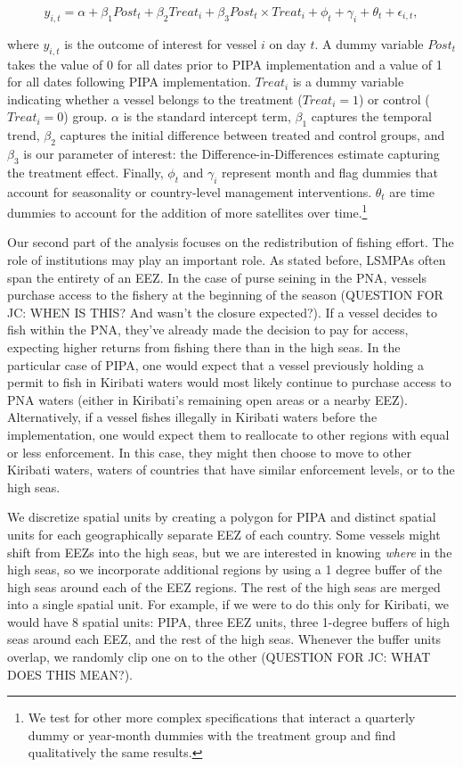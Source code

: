 \documentclass[11pt,english]{article}
\begin{document}
\[
y_{i,t} = \alpha + \beta_1 Post_t + \beta_2 Treat_i + \beta_3 Post_t \times Treat_i + \phi_t + \gamma_i + \theta_t + \epsilon_{i,t},
\]

where \(y_{i,t}\) is the outcome of interest for vessel \(i\) on day \(t\). A dummy variable \(Post_t\) takes the value of 0 for all
dates prior to PIPA implementation and a value of 1 for all dates
following PIPA implementation. \(Treat_i\) is a dummy
variable indicating whether a vessel belongs to the treatment (\(Treat_i = 1\)) or control
(\(Treat_i = 0\)) group. \(\alpha\) is
the standard intercept term, \(\beta_1\) captures the temporal trend,
\(\beta_2\) captures the initial difference between treated and control groups,
and \(\beta_3\) is our parameter of interest: the Difference-in-Differences estimate capturing
the treatment effect. Finally, \(\phi_t\) and \(\gamma_i\) represent
month and flag dummies that account for seasonality or
country-level management interventions. \(\theta_t\) are time dummies to
account for the addition of more satellites over time.\footnote{We test for other more complex specifications that interact a quarterly dummy or year-month dummies with the treatment group and find qualitatively the same results.}

Our second part of the analysis focuses on the redistribution of fishing
effort. The role of institutions may play an important role. As stated
before, LSMPAs often span the entirety of an EEZ. In the case of purse
seining in the PNA, vessels purchase access to the fishery at the
beginning of the season (QUESTION FOR JC: WHEN IS THIS? And wasn't the closure expected?). If a vessel decides to fish within the PNA,
they've already made the decision to pay for access, expecting higher
returns from fishing there than in the high seas. In the particular case
of PIPA, one would expect that a vessel previously holding a permit to fish in
Kiribati waters would 
most likely continue to purchase access to PNA waters (either in Kiribati's remaining open areas or a nearby EEZ). Alternatively, if a vessel fishes illegally
in Kiribati waters before the implementation, one would expect them to
reallocate to other regions with equal or less enforcement. In this
case, they might then choose to move to other Kiribati waters, waters
of countries that have similar enforcement levels, or to the high seas.

We discretize spatial units by creating a polygon for
PIPA and distinct
spatial units for each geographically separate EEZ of each country. Some vessels might shift
from EEZs into the high seas, but we are interested in knowing
\emph{where} in the high seas, so we incorporate additional regions by
using a 1 degree buffer of the high seas around each of the EEZ regions.
The rest of the high seas are merged into a single spatial unit. For
example, if we were to do this only for Kiribati, we would have 8
spatial units: PIPA, three EEZ units, three 1-degree buffers of high seas
around each EEZ, and the rest of the high seas. Whenever the buffer units
overlap, we randomly clip one on to the other (QUESTION FOR JC: WHAT DOES THIS MEAN?).
\end{document}
